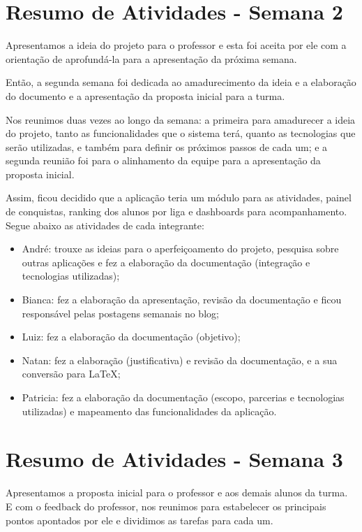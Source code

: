 \begin{apendicesenv}
\section{Resumo de Atividades - Semana 2}
Apresentamos a ideia do projeto para o professor e esta foi aceita por ele com a orientação de aprofundá-la para a apresentação da próxima semana. 

Então, a segunda semana foi dedicada ao amadurecimento da ideia e a elaboração do documento e a apresentação da proposta inicial para a turma. 

Nos reunimos duas vezes ao longo da semana: a primeira para amadurecer a ideia do projeto, tanto as funcionalidades que o sistema terá, quanto as tecnologias que serão utilizadas, e também para definir os próximos passos de cada um; e a segunda reunião foi para o alinhamento da equipe para a apresentação da proposta inicial.

Assim, ficou decidido que a aplicação teria um módulo para as atividades, painel de conquistas, ranking dos alunos por liga e \glspl{dashboard} para acompanhamento.
Segue abaixo as atividades de cada integrante:

\begin{itemize}
\item André: trouxe as ideias para o aperfeiçoamento do projeto, pesquisa sobre outras aplicações e fez a elaboração da documentação (integração e tecnologias utilizadas);
\item Bianca: fez a elaboração da apresentação, revisão da documentação e ficou responsável pelas postagens semanais no blog;
\item Luiz: fez a elaboração da documentação (objetivo);
\item Natan: fez a elaboração (justificativa) e revisão da documentação, e a sua conversão para LaTeX;
\item Patricia: fez a elaboração da documentação (escopo, parcerias e tecnologias utilizadas) e mapeamento das funcionalidades da aplicação.
\end{itemize}

\section{Resumo de Atividades - Semana 3}
Apresentamos a proposta inicial para o professor e aos demais alunos da turma. E com o \gls{feedback} do professor, nos reunimos para estabelecer os principais pontos apontados por ele e dividimos as tarefas para cada um.


\end{apendicesenv}
